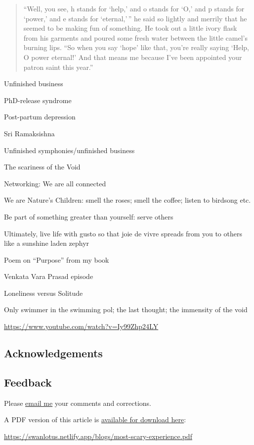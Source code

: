\documentclass[
  a4paper,
]{article}
\begin{document}
\begin{quote}
``Well, you see, h stands for `help,' and o stands for `O,' and p stands
for `power,' and e stands for `eternal,'\,'' he said so lightly and
merrily that he seemed to be making fun of something. He took out a
little ivory flask from his garments and poured some fresh water between
the little camel's burning lips. ``So when you say `hope' like that,
you're really saying `Help, O power eternal!' And that means me because
I've been appointed your patron saint this year.''
\end{quote}

Unfinished business

PhD-release syndrome

Post-partum depression

Sri Ramaksishna

Unfinished symphonies/unfinished business

The scariness of the Void

Networking: We are all connected

We are Nature's Children: smell the roses; smell the coffee; listen to
birdsong etc.

Be part of something greater than yourself: serve others

Ultimately, live life with gusto so that joie de vivre spreads from you
to others like a sunshine laden zephyr

Poem on ``Purpose'' from my book

Venkata Vara Prasad episode

Loneliness versus Solitude

Only swimmer in the swimming pol; the last thought; the immensity of the
void

\url{https://www.youtube.com/watch?v=Iy99Zhp24LY}

\hypertarget{acknowledgements}{%
\subsection{Acknowledgements}\label{acknowledgements}}

\hypertarget{feedback}{%
\subsection{Feedback}\label{feedback}}

Please \href{mailto:feedback.swanlotus@gmail.com}{email me} your
comments and corrections.

\noindent A PDF version of this article is
\href{./most-scary-experience.pdf}{available for download here}:

\begin{small}

\begin{sffamily}

\url{https://swanlotus.netlify.app/blogs/most-scary-experience.pdf}

\end{sffamily}

\end{small}
\end{document}

